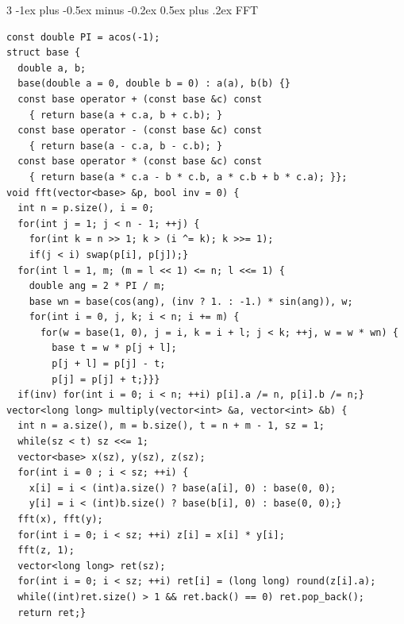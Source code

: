 \documentclass[8pt,a4paper,onesided]{article}
\makeatletter
\renewcommand{\subsection}{\@startsection{subsection}{2}{0mm}
    {-1ex plus -0.5ex minus -0.2ex} %
    {0.5ex plus .2ex}                %
    {\normalfont\large\bfseries}}    %
\makeatother
\begin{document}
\begin{multicols}{3}
\subsection{FFT}
\begin{verbatim}
const double PI = acos(-1);
struct base {
  double a, b;
  base(double a = 0, double b = 0) : a(a), b(b) {}
  const base operator + (const base &c) const
    { return base(a + c.a, b + c.b); }
  const base operator - (const base &c) const
    { return base(a - c.a, b - c.b); }
  const base operator * (const base &c) const
    { return base(a * c.a - b * c.b, a * c.b + b * c.a); }};
void fft(vector<base> &p, bool inv = 0) {
  int n = p.size(), i = 0;
  for(int j = 1; j < n - 1; ++j) {
    for(int k = n >> 1; k > (i ^= k); k >>= 1);
    if(j < i) swap(p[i], p[j]);}
  for(int l = 1, m; (m = l << 1) <= n; l <<= 1) {
    double ang = 2 * PI / m;
    base wn = base(cos(ang), (inv ? 1. : -1.) * sin(ang)), w;
    for(int i = 0, j, k; i < n; i += m) {
      for(w = base(1, 0), j = i, k = i + l; j < k; ++j, w = w * wn) {
        base t = w * p[j + l];
        p[j + l] = p[j] - t;
        p[j] = p[j] + t;}}}
  if(inv) for(int i = 0; i < n; ++i) p[i].a /= n, p[i].b /= n;}
vector<long long> multiply(vector<int> &a, vector<int> &b) {
  int n = a.size(), m = b.size(), t = n + m - 1, sz = 1;
  while(sz < t) sz <<= 1;
  vector<base> x(sz), y(sz), z(sz);
  for(int i = 0 ; i < sz; ++i) {
    x[i] = i < (int)a.size() ? base(a[i], 0) : base(0, 0);
    y[i] = i < (int)b.size() ? base(b[i], 0) : base(0, 0);}
  fft(x), fft(y);
  for(int i = 0; i < sz; ++i) z[i] = x[i] * y[i];
  fft(z, 1);
  vector<long long> ret(sz);
  for(int i = 0; i < sz; ++i) ret[i] = (long long) round(z[i].a);
  while((int)ret.size() > 1 && ret.back() == 0) ret.pop_back();
  return ret;}
\end{verbatim}

\end{multicols}
\end{document}
